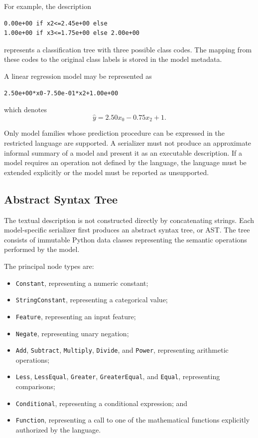 For example, the description
\begin{verbatim}
0.00e+00 if x2<=2.45e+00 else
1.00e+00 if x3<=1.75e+00 else 2.00e+00
\end{verbatim}
represents a classification tree with three possible class codes. The mapping
from these codes to the original class labels is stored in the model metadata.

A linear regression model may be represented as
\begin{verbatim}
2.50e+00*x0-7.50e-01*x2+1.00e+00
\end{verbatim}
which denotes
\[
\widehat{y}
=
2.50x_0-0.75x_2+1.
\]

Only model families whose prediction procedure can be expressed in the
restricted language are supported. A serializer must not produce an
approximate informal summary of a model and present it as an executable
description. If a model requires an operation not defined by the language, the
language must be extended explicitly or the model must be reported as
unsupported.

\subsection{Abstract Syntax Tree}


The textual description is not constructed directly by concatenating strings.
Each model-specific serializer first produces an abstract syntax tree, or AST.
The tree consists of immutable Python data classes representing the semantic
operations performed by the model.

The principal node types are:

\begin{itemize}
    \item \texttt{Constant}, representing a numeric constant;
    \item \texttt{StringConstant}, representing a categorical value;
    \item \texttt{Feature}, representing an input feature;
    \item \texttt{Negate}, representing unary negation;
    \item \texttt{Add}, \texttt{Subtract}, \texttt{Multiply},
          \texttt{Divide}, and \texttt{Power}, representing arithmetic
          operations;
    \item \texttt{Less}, \texttt{LessEqual}, \texttt{Greater},
          \texttt{GreaterEqual}, and \texttt{Equal}, representing comparisons;
    \item \texttt{Conditional}, representing a conditional expression; and
    \item \texttt{Function}, representing a call to one of the mathematical
          functions explicitly authorized by the language.
\end{itemize}

